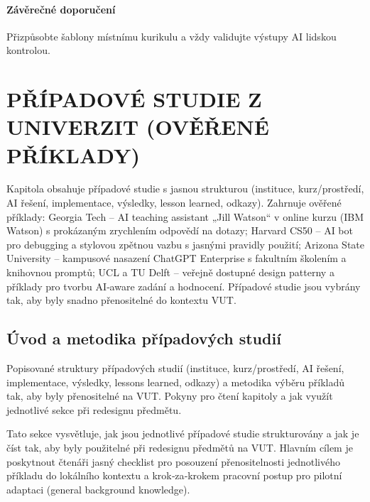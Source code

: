 \documentclass{report}%
\begin{document}
\subsubsection*{Závěrečné doporučení}
Přizpůsobte šablony místnímu kurikulu a vždy validujte výstupy AI lidskou kontrolou.%

%
\chapter{PŘÍPADOVÉ STUDIE Z UNIVERZIT (OVĚŘENÉ PŘÍKLADY)}%
Kapitola obsahuje případové studie s jasnou strukturou (instituce, kurz/prostředí, AI řešení, implementace, výsledky, lesson learned, odkazy). Zahrnuje ověřené příklady: Georgia Tech – AI teaching assistant „Jill Watson“ v online kurzu (IBM Watson) s prokázaným zrychlením odpovědí na dotazy; Harvard CS50 – AI bot pro debugging a stylovou zpětnou vazbu s jasnými pravidly použití; Arizona State University – kampusové nasazení ChatGPT Enterprise s fakultním školením a knihovnou promptů; UCL a TU Delft – veřejně dostupné design patterny a příklady pro tvorbu AI‑aware zadání a hodnocení. Případové studie jsou vybrány tak, aby byly snadno přenositelné do kontextu VUT.%
\section{Úvod a metodika případových studií}%
Popisované struktury případových studií (instituce, kurz/prostředí, AI řešení, implementace, výsledky, lessons learned, odkazy) a metodika výběru příkladů tak, aby byly přenositelné na VUT. Pokyny pro čtení kapitoly a jak využít jednotlivé sekce při redesignu předmětu.%


%

Tato sekce vysvětluje, jak jsou jednotlivé případové studie strukturovány a jak je číst tak, aby byly použitelné při redesignu předmětů na VUT. Hlavním cílem je poskytnout čtenáři jasný checklist pro posouzení přenositelnosti jednotlivého příkladu do lokálního kontextu a krok‑za‑krokem pracovní postup pro pilotní adaptaci (general background knowledge).
\end{document}
